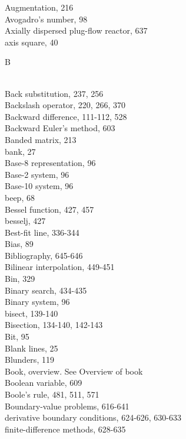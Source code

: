 \documentclass[../main.tex]{subfiles}
\begin{document}
\begin{multicols}{3}
    Augmentation, 216\\
    Avogadro's number, 98\\
    Axially dispersed plug-flow reactor, 637\\
    axis square, 40\vspace*{2mm}\\
    \begin{huge} B \end{huge}\\
    Back substitution, 237, 256\\
    Backslash operator, 220, 266, 370\\
    Backward difference, 111-112, 528\\
    Backward Euler's method, 603\\
    Banded matrix, 213\\
    bank, 27\\
    Base-8 representation, 96\\
    Base-2 system, 96\\
    Base-10 system, 96\\
    beep, 68\\
    Bessel function, 427, 457\\
    besselj, 427\\
    Best-fit line, 336-344\\
    Bias, 89\\
    Bibliography, 645-646\\
    Bilinear interpolation, 449-451\\
    Bin, 329\\
    Binary search, 434-435\\
    Binary system, 96\\
    bisect, 139-140\\
    Bisection, 134-140, 142-143\\
    Bit, 95\\
    Blank lines, 25\\
    Blunders, 119\\
    Book, overview. See Overview of book\\
    Boolean variable, 609\\
    Boole's rule, 481, 511, 571\\
    Boundary-value problems, 616-641\\
    \hspace*{3mm}derivative boundary conditions, 624-626, 630-633\\
    \hspace*{3mm}finite-difference methods, 628-635\\

\end{multicols}
\end{document}
